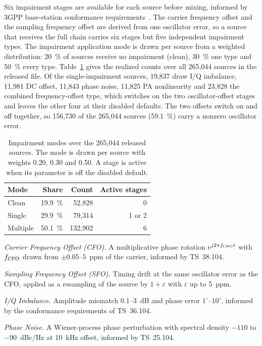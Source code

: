 \documentclass[journal]{IEEEtran}
\begin{document}
Six impairment stages are available for each source before
mixing, informed by 3GPP base-station conformance
requirements~\cite{3gpp38104,3gpp36104,3gpp25104}. The carrier frequency offset
and the sampling frequency offset are derived from one oscillator error, so a
source that receives the full chain carries six stages but five independent
impairment types. The impairment application mode is drawn per source from a
weighted distribution: 20~\% of sources receive no impairment (clean), 30~\% one
type and 50~\% every type. Table~\ref{tab:impairment} gives the realized counts
over all 265,044 sources in the released file. Of the single-impairment sources,
19,837 draw I/Q imbalance, 11,981 DC offset, 11,843 phase noise, 11,825 PA
nonlinearity and 23,828 the combined frequency-offset type, which switches on
the two oscillator-offset stages and leaves the other four at their disabled
defaults. The two offsets switch on and off together, so 156,730 of the 265,044
sources (59.1~\%) carry a nonzero oscillator error.

\begin{table}[t]
\centering
\caption{Impairment modes over the 265,044 released sources. The mode is drawn per
source with weights 0.20, 0.30 and 0.50. A stage is active when its parameter is
off the disabled default.}
\label{tab:impairment}
\begin{tabular}{lrrr}
\toprule
Mode & Share & Count & Active stages \\
\midrule
Clean & 19.9~\% & 52,828 & 0 \\
Single & 29.9~\% & 79,314 & 1 or 2 \\
Multiple & 50.1~\% & 132,902 & 6 \\
\bottomrule
\end{tabular}
\end{table}

\textit{Carrier Frequency Offset (CFO).} A multiplicative phase rotation
$e^{j2\pi f_{\rm CFO} t}$ with $f_{\rm CFO}$ drawn from $\pm0.05$--$5$~ppm
of the carrier, informed by TS~38.104.

\textit{Sampling Frequency Offset (SFO).} Timing drift at the same oscillator
error as the CFO, applied as a resampling of the source by $1 + \varepsilon$
with $\varepsilon$ up to 5~ppm.

\textit{I/Q Imbalance.} Amplitude mismatch 0.1--3~dB and phase error
$1^\circ$--$10^\circ$, informed by the conformance requirements of
TS~36.104.

\textit{Phase Noise.} A Wiener-process phase perturbation with spectral
density $-110$ to $-90$~dBc/Hz at 10~kHz offset, informed by TS~25.104.
\end{document}
